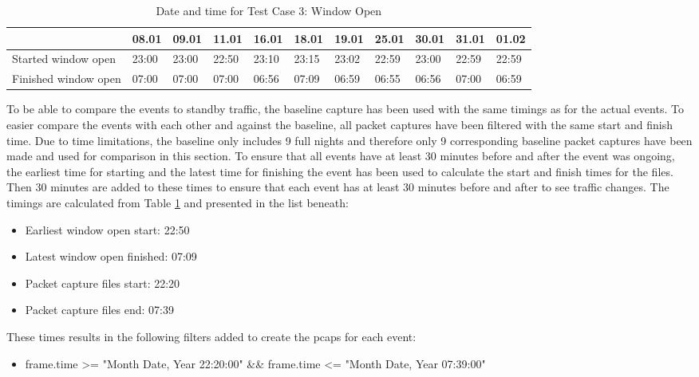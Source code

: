 \begin{table}[H]
    \centering
    \caption{Date and time for Test Case 3: Window Open}
    \begin{adjustbox}{width=1\textwidth} 
            \begin{tabular}{l|l|l|l|l|l|l|l|l|l|l|}
                \cline{2-11}
                & 08.01 & 09.01 & 11.01 & 16.01 & 18.01 & 19.01 & 25.01 & 30.01 & 31.01 & 01.02 \\ \hline
                \multicolumn{1}{|l|}{Started window open}  & 23:00 & 23:00 & 22:50 & 23:10 & 23:15 & 23:02 & 22:59 & 23:00 & 22:59 & 22:59 \\ \hline
                \multicolumn{1}{|l|}{Finished window open} & 07:00 & 07:00 & 07:00 & 06:56 & 07:09 & 06:59 & 06:55 & 06:56 & 07:00 & 06:59 \\ \hline
            \end{tabular}
    \end{adjustbox}
    \label{tab:WindowDates}
\end{table}

To be able to compare the events to standby traffic, the baseline capture has been used with the same timings as for the actual events. To easier compare the events with each other and against the baseline, all packet captures have been filtered with the same start and finish time. Due to time limitations, the baseline only includes 9 full nights and therefore only 9 corresponding baseline packet captures have been made and used for comparison in this section. To ensure that all events have at least 30 minutes before and after the event was ongoing, the earliest time for starting and the latest time for finishing the event has been used to calculate the start and finish times for the files. Then 30 minutes are added to these times to ensure that each event has at least 30 minutes before and after to see traffic changes. The timings are calculated from Table \ref{tab:WindowDates} and presented in the list beneath: 

\begin{itemize}
    \item Earliest window open start: 22:50
    \item Latest window open finished: 07:09
    \item Packet capture files start: 22:20
    \item Packet capture files end: 07:39
\end{itemize}

These times results in the following filters added to create the pcaps for each event:
\begin{itemize}
    \item frame.time >= "Month Date, Year 22:20:00" \&\& frame.time <= "Month Date, Year 07:39:00"
\end{itemize}

